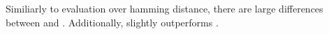 Similiarly to evaluation over hamming distance, there are large differences between
 and .
Additionally,  slightly outperforms .
